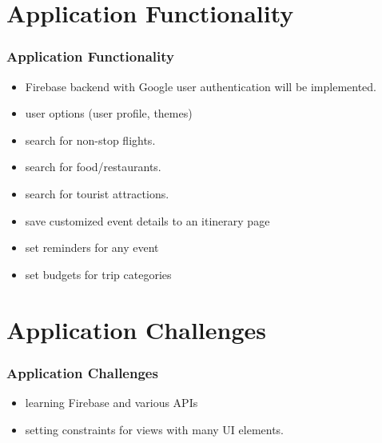 \documentclass{beamer}
\begin{document}
\section{Application Functionality}
\begin{frame}
\frametitle{Application Functionality}
    \begin{itemize}
        \item Firebase backend with Google user authentication will be implemented.
        \item user options (user profile, themes)
		\item search for non-stop flights.
		\item search for food/restaurants.
		\item search for tourist attractions.
		\item save customized event details to an itinerary page
		\item set reminders for any event 
		\item set budgets for trip categories
    \end{itemize}
\end{frame}

\section{Application Challenges}
\begin{frame}
\frametitle{Application Challenges}
    \begin{itemize}
		\item learning Firebase and various APIs
		\item setting constraints for views with many UI elements.
    \end{itemize}
\end{frame}
\end{document}
